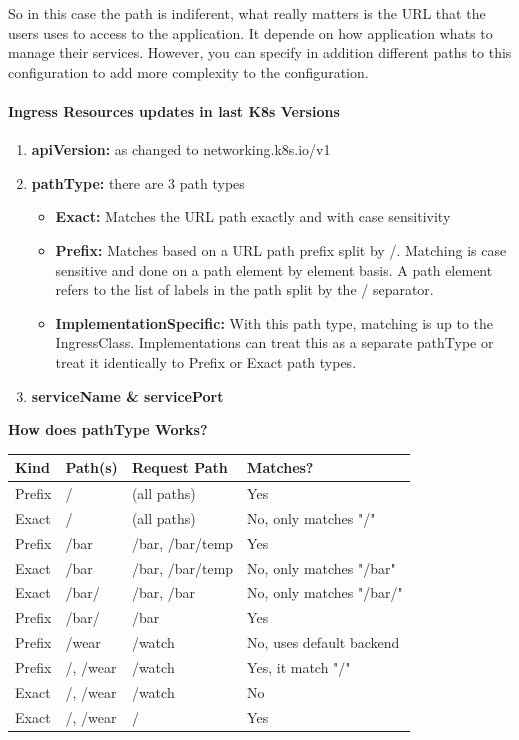 \documentclass{article}
\begin{document}
So in this case the path is indiferent, what really matters is the URL that the users uses to access to the application. It depende on how application whats to manage their services. However, you can specify in addition different paths to this configuration to add more complexity to the configuration.

\paragraph{Ingress Resources updates in last K8s Versions}

\begin{enumerate}
    \item \textbf{apiVersion:} as changed to networking.k8s.io/v1
    \item \textbf{pathType:} there are 3 path types
    \begin{itemize}
        \item \textbf{Exact:} Matches the URL path exactly and with case sensitivity
        \item \textbf{Prefix:} Matches based on a URL path prefix split by /. Matching is case sensitive and done on a path element by element basis. A path element refers to the list of labels in the path split by the / separator.
        \item \textbf{ImplementationSpecific:} With this path type, matching is up to the IngressClass. Implementations can treat this as a separate pathType or treat it identically to Prefix or Exact path types.
    \end{itemize}
    \item \textbf{serviceName \& servicePort}
\end{enumerate}

\textbf{How does pathType Works?}
\begin{table}[H]
\begin{tabular}{| m{2.5cm} | m{2cm} | m{3.5cm} | m{4cm} |}
\hline
\textbf{Kind} & \textbf{Path(s)} & \textbf{Request Path} & \textbf{Matches?} \\ \hline
Prefix & / & (all paths) & Yes \\ \hline
Exact & / & (all paths) & No, only matches "/" \\ \hline
Prefix & /bar & /bar, /bar/temp & Yes \\ \hline
Exact & /bar & /bar, /bar/temp & No, only matches "/bar" \\ \hline
Exact & /bar/ & /bar, /bar & No, only matches "/bar/" \\ \hline
Prefix & /bar/ & /bar & Yes \\ \hline
Prefix & /wear & /watch & No, uses default backend \\ \hline
Prefix & /, /wear & /watch & Yes, it match "/" \\ \hline
Exact & /, /wear & /watch & No \\ \hline
Exact & /, /wear & / & Yes \\ \hline
\end{tabular}
\end{table}
\end{document}
